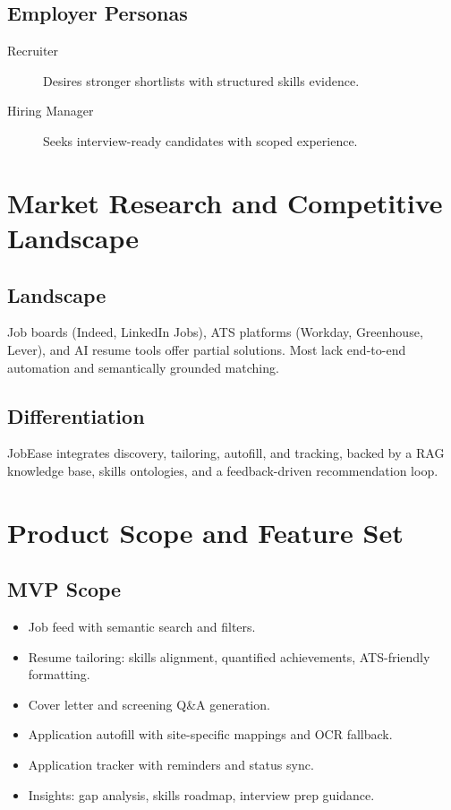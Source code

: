 \documentclass[12pt,a4paper]{article}
\begin{document}
\subsection{Employer Personas}
\begin{description}
  \item[Recruiter] Desires stronger shortlists with structured skills evidence.
  \item[Hiring Manager] Seeks interview-ready candidates with scoped experience.
\end{description}

\section{Market Research and Competitive Landscape}
\subsection{Landscape}
Job boards (Indeed, LinkedIn Jobs), ATS platforms (Workday, Greenhouse, Lever), and AI resume tools offer partial solutions. Most lack end-to-end automation and semantically grounded matching.
\subsection{Differentiation}
JobEase integrates discovery, tailoring, autofill, and tracking, backed by a RAG knowledge base, skills ontologies, and a feedback-driven recommendation loop.

\section{Product Scope and Feature Set}
\subsection{MVP Scope}
\begin{itemize}[leftmargin=2em]
  \item Job feed with semantic search and filters.
  \item Resume tailoring: skills alignment, quantified achievements, ATS-friendly formatting.
  \item Cover letter and screening Q\&A generation.
  \item Application autofill with site-specific mappings and OCR fallback.
  \item Application tracker with reminders and status sync.
  \item Insights: gap analysis, skills roadmap, interview prep guidance.
\end{itemize}
\end{document}
